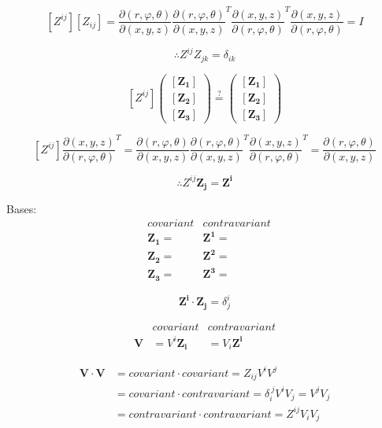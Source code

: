\documentclass{article} %
\begin{document}
$$[Z^{ij}][Z_{ij}] =
\frac{\partial(r, \varphi, \theta)}{\partial(x,y,z)}
\frac{\partial(r, \varphi, \theta)}{\partial(x,y,z)}^T
\frac{\partial(x,y,z)}{\partial(r, \varphi, \theta)}^T
\frac{\partial(x,y,z)}{\partial(r, \varphi, \theta)}
=I
$$

$$\therefore Z^{ij}Z_{jk} = \delta_{ik}$$

$$
[Z^{ij}] 
\begin{pmatrix}
  [\mathbf{Z_1}] \\
  [\mathbf{Z_2}] \\
  [\mathbf{Z_3}]
\end{pmatrix}
\overset{?}= 
\begin{pmatrix}
  [\mathbf{Z_1}] \\
  [\mathbf{Z_2}] \\
  [\mathbf{Z_3}]
\end{pmatrix}
$$

$$
[Z^{ij}]
\frac{\partial(x,y,z)}{\partial(r, \varphi, \theta)}^T
=
\frac{\partial(r, \varphi, \theta)}{\partial(x,y,z)}
\frac{\partial(r, \varphi, \theta)}{\partial(x,y,z)}^T
\frac{\partial(x,y,z)}{\partial(r, \varphi, \theta)}^T
=
\frac{\partial(r, \varphi, \theta)}{\partial(x,y,z)}
$$

$$\therefore Z^{ij}\mathbf{Z_j} = \mathbf{Z^i}$$

Bases:
\begin{align*}
&covariant  &contravariant\\
&\mathbf{Z_1} =  &\mathbf{Z^1} = \\
&\mathbf{Z_2} =  &\mathbf{Z^2} = \\
&\mathbf{Z_3} =  &\mathbf{Z^3} = 
\end{align*}

$$\mathbf{Z^{i}} \cdot \mathbf{Z_j} = \delta^i_j$$

\begin{align*}
&covariant &contravariant\\
\mathbf{V} &= V^i \mathbf{Z_i} &= V_i \mathbf{Z^i}
\end{align*}

\begin{align*}
  \mathbf{V}\cdot\mathbf{V}
  &= covariant \cdot covariant = Z_{ij} V^i V^j \\
  &= covariant \cdot contravariant = \delta_i^{\ j} V^i V_j = V^j V_j\\
  &= contravariant \cdot contravariant = Z^{ij} V_i V_j \\
\end{align*}
\end{document}
